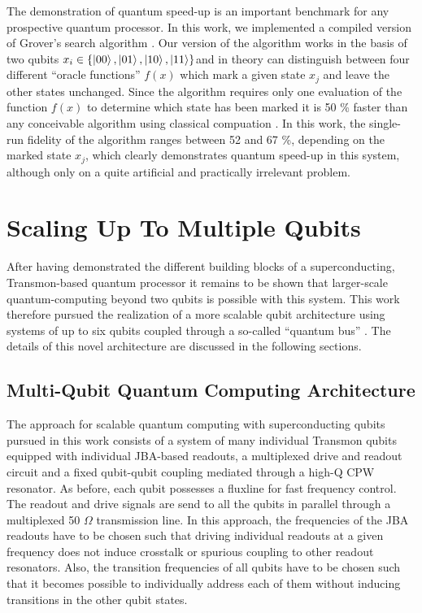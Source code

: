 The demonstration of quantum speed-up is an important benchmark for any prospective quantum processor. In this work, we implemented a compiled version of Grover's search algorithm \citep{Grover_Quantum_1997}. Our version of the algorithm works in the basis of two qubits $x_i \in \{\left| 00 \right>,\left| 01 \right>,\left| 10 \right>,\left| 11 \right>\}$and in theory can distinguish between four different ``oracle functions'' $f(x)$ which mark a given state $x_j$ and leave the other states unchanged. Since the algorithm requires only one evaluation of the function $f(x)$ to determine which state has been marked it is 50 \% faster than any conceivable algorithm using classical compuation . In this work, the single-run fidelity of the algorithm ranges between 52 and 67 \%, depending on the marked state $x_j$, which clearly demonstrates quantum speed-up in this system, although only on a quite artificial and practically irrelevant problem.

\section{Scaling Up To Multiple Qubits}

After having demonstrated the different building blocks of a superconducting, Transmon-based quantum processor it remains to be shown that larger-scale quantum-computing beyond two qubits is possible with this system. This work therefore pursued the realization of a more scalable qubit architecture using systems of up to six qubits coupled through a so-called ``quantum bus'' \citep{majer_coupling_2007}. The details of this novel architecture are discussed in the following sections.

\subsection{Multi-Qubit Quantum Computing Architecture}

The approach for scalable quantum computing with superconducting qubits pursued in this work consists of a system of many individual Transmon qubits equipped with individual JBA-based readouts, a multiplexed drive and readout circuit and a fixed qubit-qubit coupling mediated through a high-Q CPW resonator. As before, each qubit possesses a fluxline for fast frequency control. The readout and drive signals are send to all the qubits in parallel through a multiplexed 50 $\Omega$ transmission line. In this approach, the frequencies of the JBA readouts have to be chosen such that driving individual readouts at a given frequency does not induce crosstalk or spurious coupling to other readout resonators. Also, the transition frequencies of all qubits have to be chosen such that it becomes possible to individually address each of them without inducing transitions in the other qubit states.

